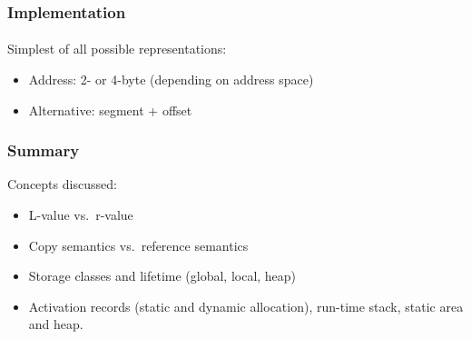 \documentclass{beamer}
\begin{document}
{\begin{frame}[fragile]
\end{frame}



\begin{frame}[fragile]
\frametitle{Implementation}
\framesubtitle{}
Simplest of all possible representations:
\begin{itemize}
\item Address: 2- or 4-byte (depending on address space)
\item Alternative: segment + offset
\end{itemize}
\end{frame}


} %

\begin{frame}[fragile]
\frametitle{Summary}
Concepts discussed:
\bigskip

\begin{itemize}
\item L-value vs.\ r-value
\item Copy semantics vs.\ reference semantics
\item Storage classes and lifetime (global, local, heap)
\item Activation records (static and dynamic allocation), run-time stack,
static area and heap. 
\end{itemize}
\end{frame}
\end{document}
